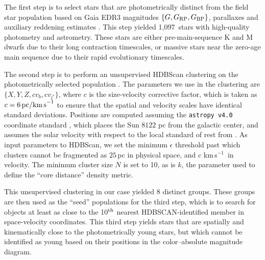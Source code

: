 \documentclass[12pt,twocolumn]{aastex63}
\newcommand{\npms}{1{,}097} %
\newcommand{\kms}{\,km\,s$^{-1}$}
\begin{document}
The first step is to select stars that are photometrically distinct
from the field star population based on Gaia EDR3 magnitudes $\{G,
G_{\rm RP}, G_{\rm BP}\}$, parallaxes and auxiliary reddening
estimates \citep{lallement_gaia-2mass_2019}.  This step yielded \npms\
stars with high-quality photometry and astrometry.  These stars are
either pre-main-sequence K and M dwarfs due to their long contraction
timescales, or massive stars near the zero-age main sequence due to
their rapid evolutionary timescales.

The second step is to perform an unsupervised HDBScan clustering on
the photometrically selected population
\citep{campello_hierarchical_2015,mcinnes_hdbscan_2017}.  The
parameters we use in the clustering are $\{ X, Y, Z, c v_b, c v_{l^*}
\} $, where $c$ is the size-velocity corrective factor, which is taken
as $c=6\,{\rm pc / km\,s}^{-1}$ to ensure that the spatial and
velocity scales have identical standard deviations.  Positions are
computed assuming the \texttt{astropy v4.0} coordinate standard
\citep{astropy_2018}, which places the Sun $8122$ pc from the galactic
center, and assumes the solar velocity with respect to the local
standard of rest from \citet{schonrich_local_2010}.  As input
parameters to HDBScan, we set the minimum $\epsilon$ threshold past
which clusters cannot be fragmented as $25$\,pc in physical space, and
$c$\,\kms\ in velocity.  The minimum cluster size $N$ is set to 10, as
is $k$, the parameter used to define the ``core distance'' density
metric. 

This unsupervised clustering in our case yielded 8 distinct groups.
These groups are then used as the ``seed'' populations for the third
step, which is to search for objects at least as close to the 10$^{\rm
th}$ nearest HDBSCAN-identified member in space-velocity coordinates.
This third step yields stars that are spatially and kinematically
close to the photometrically young stars, but which cannot be
identified as young based on their positions in the color--absolute
magnitude diagram.
\end{document}
